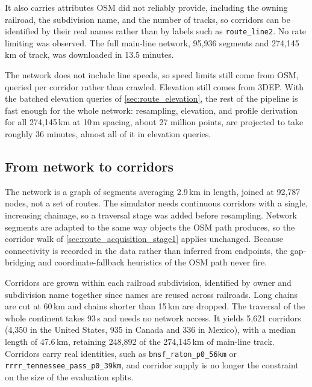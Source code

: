 It also carries attributes OSM did not reliably provide, including the owning railroad, the subdivision name, and the number of tracks, so corridors can be identified by their real names rather than by labels such as \texttt{route\_line2}. No rate limiting was observed. The full main-line network, 95,936 segments and 274,145\,km of track, was downloaded in 13.5 minutes.

The network does not include line speeds, so speed limits still come from OSM, queried per corridor rather than crawled.
Elevation still comes from 3DEP. With the batched elevation queries of \cref{sec:route_elevation}, the rest of the pipeline is fast enough for the whole network: resampling, elevation, and profile derivation for all 274,145\,km at 10\,m spacing, about 27 million points, are projected to take roughly 36 minutes, almost all of it in elevation queries.

\subsection{From network to corridors}

The network is a graph of segments averaging 2.9\,km in length, joined at 92,787 nodes, not a set of routes. The simulator needs continuous corridors with a single, increasing chainage, so a traversal stage was added before resampling. Network segments are adapted to the same way objects the OSM path produces, so the corridor walk of \cref{sec:route_acquisition_stage1} applies unchanged. Because connectivity is recorded in the data rather than inferred from endpoints, the gap-bridging and coordinate-fallback heuristics of the OSM path never fire.

Corridors are grown within each railroad subdivision, identified by owner and subdivision name together since names are reused across railroads. Long chains are cut at 60\,km and chains shorter than 15\,km are dropped. The traversal of the whole continent takes 93\,s and needs no network access. It yields 5,621 corridors (4,350 in the United States, 935 in Canada and 336 in Mexico), with a median length of 47.6\,km, retaining 248,892 of the 274,145\,km of main-line track. Corridors carry real identities, such as \texttt{bnsf\_raton\_p0\_56km} or \texttt{rrrr\_tennessee\_pass\_p0\_39km}, and corridor supply is no longer the constraint on the size of the evaluation splits.

